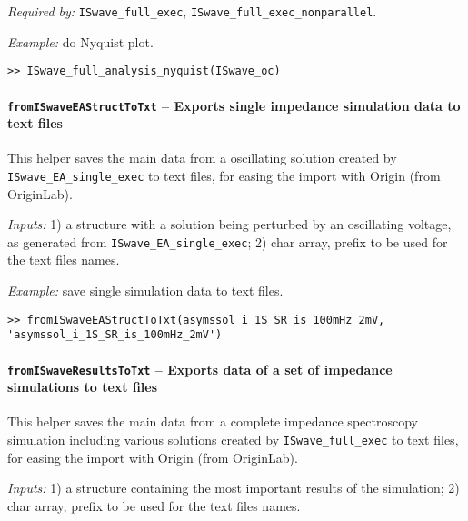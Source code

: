 
	\textit{Required by:} \texttt{IS\-wave\_full\_exec}, \texttt{IS\-wave\_full\_exec\_nonparallel}.

	\textit{Example:} do Nyquist plot.
	\begin{lstlisting}[style=Matlab-editor]
>> ISwave_full_analysis_nyquist(ISwave_oc)
\end{lstlisting}




	\paragraph{\texttt{from\-IS\-waveEA\-Struct\-ToTxt} -- Exports single impedance simulation data to text files}
	This helper saves the main data from a oscillating solution created by \texttt{IS\-wave\_EA\_single\_exec} to text files, for easing the import with Origin (from OriginLab).

	\textit{Inputs:} 1) a structure with a solution being perturbed by an oscillating voltage, as generated from \texttt{IS\-wave\_EA\_single\_exec};
	2) char array, prefix to be used for the text files names.




	\textit{Example:} save single simulation data to text files.
	\begin{lstlisting}[style=Matlab-editor]
>> fromISwaveEAStructToTxt(asymssol_i_1S_SR_is_100mHz_2mV, 'asymssol_i_1S_SR_is_100mHz_2mV')
\end{lstlisting}

	\paragraph{\texttt{from\-IS\-wave\-Results\-ToTxt} -- Exports data of a set of impedance simulations to text files}
	This helper saves the main data from a complete impedance spectroscopy simulation including various solutions created by \texttt{IS\-wave\_full\_exec} to text files, for easing the import with Origin (from OriginLab).

	\textit{Inputs:} 1) a structure containing the most important results of the simulation;
	2) char array, prefix to be used for the text files names.



